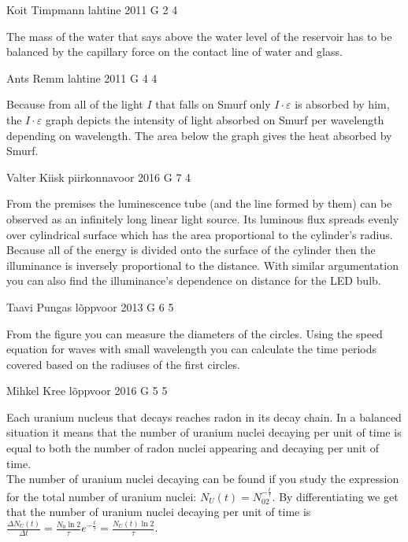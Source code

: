 \documentclass[11pt]{article}
\begin{document}
{Koit Timpmann} %
{lahtine} %
{2011} %
{G 2} %
{4} %
{

\ifEngHint
The mass of the water that says above the water level of the reservoir has to be balanced by the capillary force on the contact line of water and glass.
\fi
}

{Ants Remm} %
{lahtine} %
{2011} %
{G 4} %
{4} %
{

\ifEngHint
Because from all of the light $I$ that falls on Smurf only $ I \cdot\varepsilon $ is absorbed by him, the $ I \cdot \varepsilon $ graph depicts the intensity of light absorbed on Smurf per wavelength depending on wavelength. The area below the graph gives the heat absorbed by Smurf.
\fi
}

{Valter Kiisk} %
{piirkonnavoor} %
{2016} %
{G 7} %
{4} %
{

\ifEngHint
From the premises the luminescence tube (and the line formed by them) can be observed as an infinitely long linear light source. Its luminous flux spreads evenly over cylindrical surface which has the area proportional to the cylinder’s radius. Because all of the energy is divided onto the surface of the cylinder then the illuminance is inversely proportional to the distance. With similar argumentation you can also find the illuminance’s dependence on distance for the LED bulb.
\fi
}

{Taavi Pungas} %
{lõppvoor} %
{2013} %
{G 6} %
{5} %
{

\ifEngHint
From the figure you can measure the diameters of the circles. Using the speed equation for waves with small wavelength you can calculate the time periods covered based on the radiuses of the first circles.
\fi
}

{Mihkel Kree} %
{lõppvoor} %
{2016} %
{G 5} %
{5} %
{

\ifEngHint
Each uranium nucleus that decays reaches radon in its decay chain. In a balanced situation it means that the number of uranium nuclei decaying per unit of time is equal to both the number of radon nuclei appearing and decaying per unit of time.\\
The number of uranium nuclei decaying can be found if you study the expression for the total number of uranium nuclei: $N_U(t) = N_02^{-\frac{t}{\tau}}$. By differentiating we get that the number of uranium nuclei decaying per unit of time is $\frac{\Delta N_U(t)}{\Delta t} = \frac{N_0\ln 2}{\tau}e^{-\frac{t}{\tau}} = \frac{N_U(t)\ln 2}{\tau}$.
\fi
}
\end{document}
